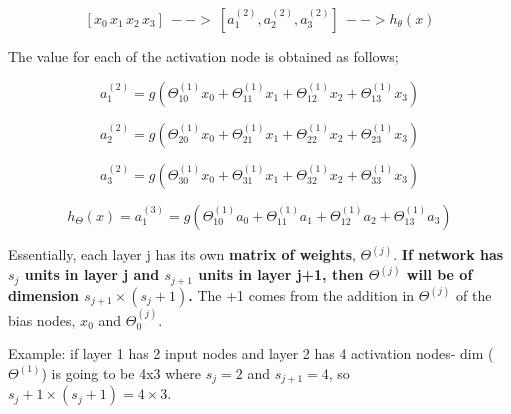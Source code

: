             \[
                \boxed{
                [x_0 \, x_1 \, x_2\, x_3] \:--> \: [ a_1^{(2)},a_2^{(2)},a_3^{(2)}] \: --> h_\theta (x)
            }
            \]  
    
            The value for each of the activation node is obtained as follows;

            \[
                a_1^{(2)} = g (\Theta^{(1)}_{10} x_0 + \Theta^{(1)}_{11} x_1 + \Theta^{(1)}_{12} x_2+\Theta^{(1)}_{13} x_3 )
            \] 

            \[
                a_2^{(2)} = g (\Theta^{(1)}_{20} x_0 + \Theta^{(1)}_{21} x_1 + \Theta^{(1)}_{22} x_2+\Theta^{(1)}_{23} x_3 )
            \] 

            \[
                a_3^{(2)} = g (\Theta^{(1)}_{30} x_0 + \Theta^{(1)}_{31} x_1 + \Theta^{(1)}_{32} x_2+\Theta^{(1)}_{33} x_3 )
            \] 

            \[
                h_\Theta(x) = a_1^{(3)} = g (\Theta^{(1)}_{10} a_0 + \Theta^{(1)}_{11} a_1 + \Theta^{(1)}_{12} a_2+\Theta^{(1)}_{13} a_3 )
            \] 

            Essentially, each layer j has its own \textbf{matrix of weights}, $\Theta^{(j)}$. \textbf{If network has $s_j$ units in layer j and $s_{j+1}$ units in layer j+1, then $\Theta^{(j)}$ will be of dimension $s_{j+1} \times (s_j +1)$.} The +1 comes from the addition in $\Theta^{(j)}$ of the bias nodes, $x_0$ and $\Theta_0^{(j)}$. 

            Example: if layer 1 has 2 input nodes and layer 2 has 4 activation nodes- dim ($\Theta^{(1)}$) is going to be 4x3 where $s_j=2$ and $s_{j+1}=4$, so $s_j+1\times (s_j +1)=4\times3$.

